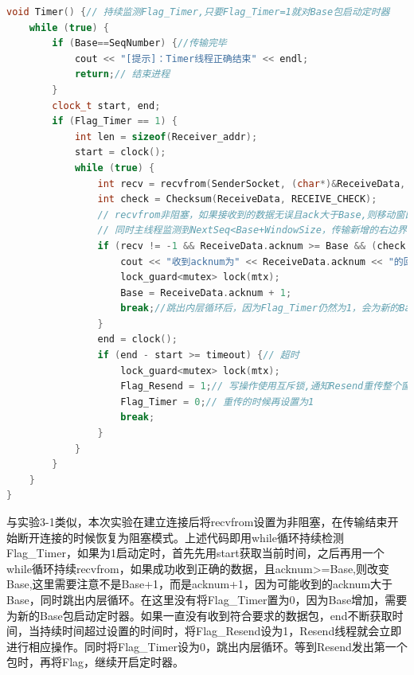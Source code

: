 \documentclass[UTF8,a4paper,10pt]{ctexart}
\begin{document}
\begin{lstlisting}[frame=trbl,language={C++}]
void Timer() {// 持续监测Flag_Timer,只要Flag_Timer=1就对Base包启动定时器
    while (true) {
        if (Base==SeqNumber) {//传输完毕
            cout << "[提示]：Timer线程正确结束" << endl;
            return;// 结束进程
        }
        clock_t start, end;
        if (Flag_Timer == 1) {
            int len = sizeof(Receiver_addr);
            start = clock();
            while (true) {
                int recv = recvfrom(SenderSocket, (char*)&ReceiveData, DatagramLen, 0, (struct sockaddr*)&Receiver_addr, &len);
                int check = Checksum(ReceiveData, RECEIVE_CHECK);
                // recvfrom非阻塞，如果接收到的数据无误且ack大于Base,则移动窗口左边界，用队列来实现
                // 同时主线程监测到NextSeq<Base+WindowSize，传输新增的右边界窗口，从而实现滑动窗口的功能
                if (recv != -1 && ReceiveData.acknum >= Base && (check ^ ReceiveData.checksum) == 0xffff) {
                    cout << "收到acknum为" << ReceiveData.acknum << "的回复" << endl;
                    lock_guard<mutex> lock(mtx);
                    Base = ReceiveData.acknum + 1;
                    break;//跳出内层循环后，因为Flag_Timer仍然为1，会为新的Base设置定时器
                }
                end = clock();
                if (end - start >= timeout) {// 超时
                    lock_guard<mutex> lock(mtx);
                    Flag_Resend = 1;// 写操作使用互斥锁,通知Resend重传整个窗口
                    Flag_Timer = 0;// 重传的时候再设置为1
                    break;
                }
            }
        }
    }
}
\end{lstlisting}\par
与实验3-1类似，本次实验在建立连接后将recvfrom设置为非阻塞，在传输结束开始断开连接的时候恢复为阻塞模式。上述代码即用while循环持续检测Flag\_Timer，如果为1启动定时，首先先用start获取当前时间，之后再用一个while循环持续recvfrom，如果成功收到正确的数据，且acknum>=Base,则改变Base,这里需要注意不是Base+1，而是acknum+1，因为可能收到的acknum大于Base，同时跳出内层循环。在这里没有将Flag\_Timer置为0，因为Base增加，需要为新的Base包启动定时器。如果一直没有收到符合要求的数据包，end不断获取时间，当持续时间超过设置的时间时，将Flag\_Resend设为1，Resend线程就会立即进行相应操作。同时将Flag\_Timer设为0，跳出内层循环。等到Resend发出第一个包时，再将Flag，继续开启定时器。
\end{document}
